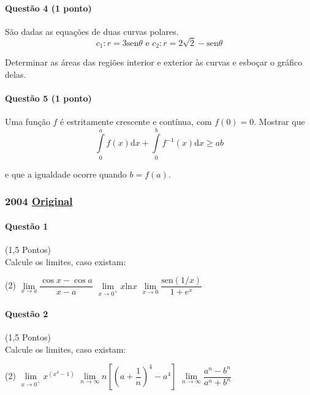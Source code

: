 \documentclass[12pt,a4paper]{article}
\newcommand{\original}[1]{\tiny \href{#1}{Original} \normalsize}
\begin{document}
\paragraph{Questão 4 (1 ponto)}

São dadas as equações de duas curvas polares.
$$c_1: r= 3\mathrm{sen}\theta \text{ e }c_2: r = 2\sqrt{2} - \mathrm{sen}\theta$$

\noindent Determinar as áreas das regiões interior e exterior às curvas e esboçar o gráfico delas. \normalsize

\paragraph{Questão 5 (1 ponto)}

Uma função $f$ é estritamente crescente e contínua, com $f(0) = 0$. Mostrar que $$\int\limits_{0}^{a} f(x)\mathrm{d}x + \int\limits_{0}^{b} f^{-1}(x)\mathrm{d}x \ge ab$$

e que a igualdade ocorre quando $b=f(a)$.

\newpage

\subsubsection{2004  \original{https://drive.google.com/open?id=1rwT6guwYhYzv9RXt-GaY-DZw5l7VbjB5}}


\paragraph{Questão 1} (1,5 Pontos)\\
Calcule os limites, caso existam:

\begin{tasks}(2)
\task $\lim\limits_{x\to a} \dfrac{\cos x - \cos a}{x-a}$
\task $\lim\limits_{x\to 0^+} x\mathrm{ln}x$
\task $\lim\limits_{x\to 0} \dfrac{\mathrm{sen}(1/x)}{1+e^x}$
\end{tasks}

\paragraph{Questão 2} (1,5 Pontos)\\
Calcule os limites, caso existam:

\begin{tasks}(2)
\task $\lim\limits_{x\to 0^+} x^{(x^4-1)}$
\task $\lim\limits_{n\to \infty} n[(a+\dfrac{1}{n})^4 - a^4]$
\task $\lim\limits_{n\to \infty} \dfrac{a^n - b^n}{a^n + b^n}$
\end{tasks}
\end{document}
